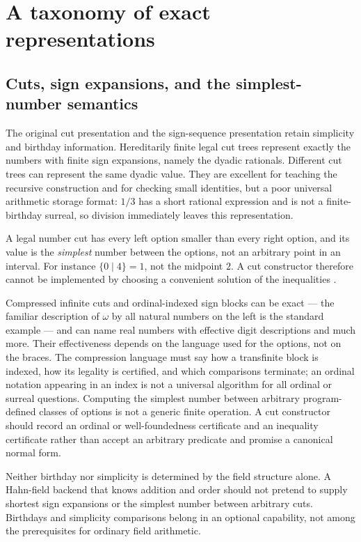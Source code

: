 \documentclass[11pt,letterpaper]{article}
\numberwithin{equation}{section}
\theoremstyle{definition}
\theoremstyle{remark}
\begin{document}
\section{A taxonomy of exact representations}
\label{cas:sec-representations}

\subsection{Cuts, sign expansions, and the simplest-number semantics}
\label{cas:sub-cuts}
The original cut presentation and the sign-sequence presentation retain
simplicity and birthday information. Hereditarily finite legal cut trees
represent exactly the numbers with finite sign expansions, namely the dyadic
rationals. Different cut trees can represent the same dyadic value.
They are excellent for teaching the recursive construction and for checking
small identities, but a poor universal arithmetic storage format: $1/3$ has a
short rational expression and is not a finite-birthday surreal, so division
immediately leaves this representation.

A legal number cut has every left option smaller than every right option, and
its value is the \emph{simplest} number between the options, not an arbitrary
point in an interval. For instance $\{0\mid4\}=1$, not the midpoint $2$. A cut
constructor therefore cannot be implemented by choosing a convenient solution of
the inequalities \cite{cas:Gonshor}.

Compressed infinite cuts and ordinal-indexed sign blocks can be exact --- the
familiar description of $\omega$ by all natural numbers on the left is the
standard example --- and can name real numbers with effective digit
descriptions and much more. Their effectiveness depends on the language used for
the options, not on the braces. The compression language must say how a
transfinite block is indexed, how its legality is certified, and which
comparisons terminate; an ordinal notation appearing in an index is not a
universal algorithm for all ordinal or surreal questions. Computing the simplest
number between arbitrary program-defined classes of options is not a generic
finite operation. A cut constructor should record an ordinal or
well-foundedness certificate and an inequality certificate rather than accept an
arbitrary predicate and promise a canonical normal form.

Neither birthday nor simplicity is determined by the field structure alone. A
Hahn-field backend that knows addition and order should not pretend to supply
shortest sign expansions or the simplest number between arbitrary cuts.
Birthdays and simplicity comparisons belong in an optional capability, not among
the prerequisites for ordinary field arithmetic.
\end{document}
